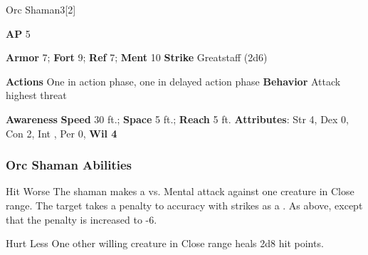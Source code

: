 \begin{monsection}{Orc Shaman}{3}[2]
\vspace{-1em}\vspace{-1em}
\begin{spellcontent}
\begin{spelltargetinginfo}
{\textbf{AP} 5}

\pari \textbf{Armor} 7;
\textbf{Fort} 9;
\textbf{Ref} 7;
\textbf{Ment} 10
\pari \textbf{Strike} Greatstaff  (2d6)


\pari \textbf{Actions} One in action phase, one in delayed action phase
\pari \textbf{Behavior} Attack highest threat
\end{spelltargetinginfo}
\end{spellcontent}

\begin{monsterfooter}
\pari \textbf{Awareness} 
\pari \textbf{Speed} 30 ft.;
\textbf{Space} 5 ft.;
\textbf{Reach} 5 ft.
\pari \textbf{Attributes}:
Str 4,
Dex 0,
Con 2,
Int ,
Per 0,
\textbf{Wil 4}
\end{monsterfooter}
\end{monsection}


\subsubsection{Orc Shaman Abilities}

\begin{ability}{Hit Worse}
The shaman makes a  vs. Mental attack against one creature in Close range.
\hit The target takes a  penalty to accuracy with strikes as a .
\crit As above, except that the penalty is increased to -6.
\end{ability}

\vspace{0.5em}
\begin{ability}{Hurt Less}
One other willing creature in Close range heals 2d8 hit points.
\end{ability}






